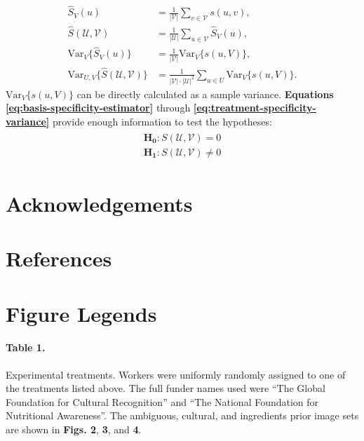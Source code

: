 \documentclass[a4paper]{report}
\begin{document}
\begin{align}
	\hat{S}_V(u) &= \frac{1}{|\mathcal{V}|} \sum_{v \in \mathcal{V}} s(u,v), 
		\label{eq:basis-specificity-estimator} \\
		\hat{S}(\mathcal{U},\mathcal{V}) 
		&= \frac{1}{|\mathcal{U}|} \sum_{u \in \mathcal{V}} \hat{S}_V(u),
		\label{eq:treatment-specificity-estimator} \\
		\text{Var}_V\{\hat{S}_V(u)\} 
			&= \frac{1}{|\mathcal{V}|}\text{Var}_V\{s(u,V)\},
		\label{eq:basis-specificity-variance} \\
		\text{Var}_{U,V}\{\hat{S}(\mathcal{U},\mathcal{V})\} 
			&= \frac{1}{|\mathcal{V}|\cdot|\mathcal{U}|^2} 
			\sum_{u\in U}\text{Var}_V\{{s}(u,V)\}.
		\label{eq:treatment-specificity-variance}
\end{align}
$\text{Var}_V\{s(u,V)\}$ can be directly calculated as a sample variance.
\textbf{Equations \ref{eq:basis-specificity-estimator}} through 
\textbf{\ref{eq:treatment-specificity-variance}} provide enough information to test the hypotheses:
\begin{align}
	\begin{matrix}
		\mathbf{H_0}: S(\mathcal{U}, \mathcal{V}) = 0 \\[0.5em]
		\mathbf{H_1}: S(\mathcal{U}, \mathcal{V}) \neq 0
	\end{matrix}
\end{align}

\section*{Acknowledgements}
\section*{References}
\begingroup
\renewcommand{\chapter}[2]{}

\endgroup
 

\section*{Figure Legends}

\paragraph{Table 1.}
	Experimental treatments.  Workers were uniformly randomly
	assigned to one of the treatments listed above.  The full funder 
	names used were ``The Global Foundation
	for Cultural Recognition'' and ``The National Foundation for 
	Nutritional Awareness''.  The ambiguous, cultural, and ingredients 
	prior image sets are shown in \textbf{Figs. 2}, \textbf{3}, and 
	\textbf{4}.
\end{document}

